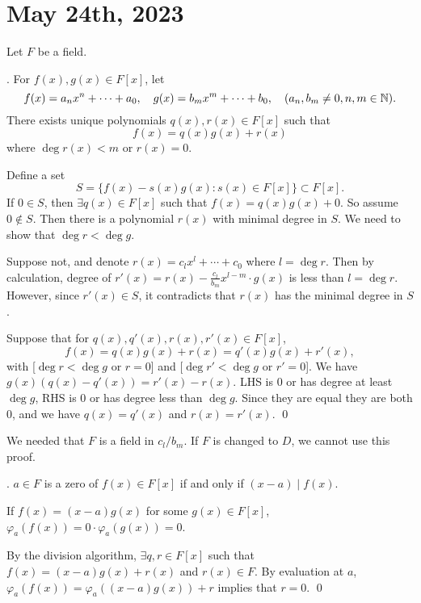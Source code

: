 \section*{May 24th, 2023}


Let \(F\) be a field.

\thm.  For \(f(x), g(x) \in F[x]\), let
\[
    f(x) = a_nx^n + \cdots + a_0, \quad g(x) = b_mx^m + \cdots + b_0, \quad (a_n, b_m \neq 0, n, m \in \mathbb{N}).
\]
There exists unique polynomials \(q(x), r(x) \in F[x]\) such that
\[
    f(x) = q(x)g(x) + r(x)
\]
where \(\deg r(x) < m\) or \(r(x) = 0\).

\pf {} Define a set
\[
    S = \{f(x) - s(x)g(x) : s(x) \in F[x]\} \subset F[x].
\]
If \(0 \in S\), then \(\exists q(x) \in F[x]\) such that \(f(x) = q(x)g(x) + 0\). So assume \(0 \notin S\). Then there is a polynomial \(r(x)\) with minimal degree in \(S\). We need to show that \(\deg r < \deg g\).

Suppose not, and denote \(r(x) = c_lx^l + \cdots + c_0\) where \(l = \deg r\). Then by calculation, degree of \(r'(x) = r(x) - \frac{c_l}{b_m} x^{l-m} \cdot g(x)\) is less than \(l = \deg r\). However, since \(r'(x) \in S\), it contradicts that \(r(x)\) has the minimal degree in \(S\).

 Suppose that for \(q(x), q'(x), r(x), r'(x) \in F[x]\),
\[
    f(x) = q(x)g(x) + r(x) = q'(x)g(x) + r'(x),
\]
with [\(\deg r < \deg g\) or \(r = 0\)] and [\(\deg r' < \deg g\) or \(r' = 0\)]. We have \(g(x) (q(x) - q'(x)) = r'(x) - r(x)\). LHS is 0 or has degree at least \(\deg g\), RHS is 0 or has degree less than \(\deg g\). Since they are equal they are both 0, and we have \(q(x) = q'(x)\) and \(r(x) = r'(x)\). \qed

\rmk We needed that \(F\) is a field in \(c_l/b_m\). If \(F\) is changed to \(D\), we cannot use this proof.

\cor.  \(a \in F\) is a zero of \(f(x) \in F[x]\) if and only if \((x-a) \mid f(x)\).

\pf \note{\mimpd} If \(f(x) = (x-a)g(x)\) for some \(g(x) \in F[x]\), \(\varphi_a(f(x)) = 0 \cdot \varphi_a(g(x)) = 0\).

\note{\mimp} By the division algorithm, \(\exists q, r \in F[x]\) such that \(f(x) = (x-a)g(x) + r(x)\) and \(r(x) \in F\). By evaluation at \(a\), \(\varphi_a(f(x)) = \varphi_a((x-a)g(x)) + r\) implies that \(r = 0\). \qed

